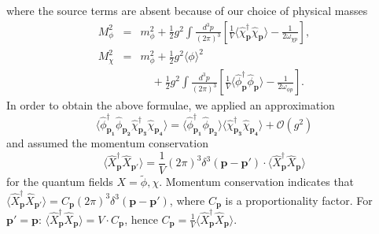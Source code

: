 \documentclass[twocolumn,showpacs,preprintnumbers,amsmath,amssymb,nofootinbib,superscriptaddress,prc]{revtex4}
\begin{document}
where the source terms are absent because of our choice of physical masses
\begin{eqnarray}
  M_\phi^2 &=& m_\phi^2+\frac{1}{2}g^2\int\frac{d^3p}{(2\pi)^3}\left[\frac{1}{V}\langle\hat{\chi}_{\textbf{p}}^{\dagger}\hat{\chi}_{\textbf{p}} \rangle -\frac{1}{2\omega_{\chi p}}\right],\\
  M_\chi^2 &=& m_\phi^2+\frac{1}{2}g^2\langle\phi\rangle^2\nonumber\\
  & & \quad+\frac{1}{2}g^2\int\frac{d^3p}{(2\pi)^3}\left[\frac{1}{V}\langle\hat{\phi}_{\textbf{p}}^{\dagger}\hat{\phi}_{\textbf{p}} \rangle -\frac{1}{2\omega_{\phi p}}\right].
\end{eqnarray}
In order to obtain the above formulae, we applied an approximation
\begin{equation}
 \langle{\hat{\phi}}_{\mathbf{p_1}}^\dagger\hat{\phi}_{\mathbf{p_2}}\hat{\chi}_{\mathbf{p_3}}^\dagger\hat{\chi}_{\mathbf{p_4}}\rangle=
 \langle{\hat{\phi}}_{\mathbf{p_1}}^\dagger\hat{\phi}_{\mathbf{p_2}}\rangle\langle\hat{\chi}_{\mathbf{p_3}}^\dagger\hat{\chi}_{\mathbf{p_4}}\rangle+\mathcal{O}(g^2)
\end{equation}
and assumed the momentum conservation
\begin{equation}
 \langle{\hat{X}}_{\mathbf{p}}^\dagger\hat{X}_{\mathbf{p'}}\rangle=\frac{1}{V}(2\pi)^3\delta^3(\mathbf{p-p'})\cdot\langle{\hat{X}}_{\mathbf{p}}^\dagger\hat{X}_{\mathbf{p}}\rangle
\end{equation}
for the quantum fields $X=\tilde{\phi},\chi$. Momentum conservation indicates that $\langle{\hat{X}}_{\mathbf{p}}^\dagger\hat{X}_{\mathbf{p'}}\rangle= C_{\mathbf{p}} (2\pi)^3\delta^3(\mathbf{p-p'})$, where $C_{\mathbf{p}}$ is a proportionality factor. For $\mathbf{p'}=\mathbf{p}$: $\langle{\hat{X}}_{\mathbf{p}}^\dagger\hat{X}_{\mathbf{p}}\rangle=V\cdot C_{\mathbf{p}}$, hence $C_{\mathbf{p}}=\frac{1}{V}\langle{\hat{X}}_{\mathbf{p}}^\dagger\hat{X}_{\mathbf{p}}\rangle$.
\end{document}
